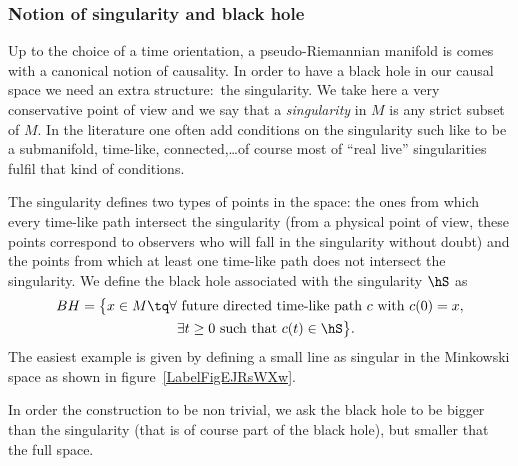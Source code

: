 \subsubsection{Notion of singularity and black hole}

Up to the choice of a time orientation, a pseudo-Riemannian manifold is comes with a canonical notion of causality. In order to have a black hole in our causal space we need an extra structure:~the singularity. We take here a very conservative point of view and we say that a \emph{singularity} in $M$ is any strict subset of $M$. In the literature one often add conditions on the singularity such like to be a submanifold, time-like, connected,\ldots of course most of ``real live'' singularities fulfil that kind of conditions.

The singularity defines two types of points in the space: the ones from which every time-like path intersect the singularity (from a physical point of view, these points correspond to observers who will fall in the singularity without doubt) and the points from which at least one time-like path does not intersect the singularity. We define the black hole associated with the singularity $\hS$ as
\begin{align}
	BH=\big\{ x\in M\tq \forall & \text{ future directed time-like path } c \text{ with } c(0)=x, \\
	                            & \exists t\geq0  \text{ such that } c(t)\in \hS \big\}.
\end{align}
The easiest example is given by defining a small line as singular in the Minkowski space as shown in figure~\ref{LabelFigEJRsWXw}.
\newcommand{\CaptionFigEJRsWXw}{The red line is the singularity and the green zone is the black hole associated with.}


In order the construction to be non trivial, we ask the black hole to be bigger than the singularity (that is of course part of the black hole), but smaller that the full space.


